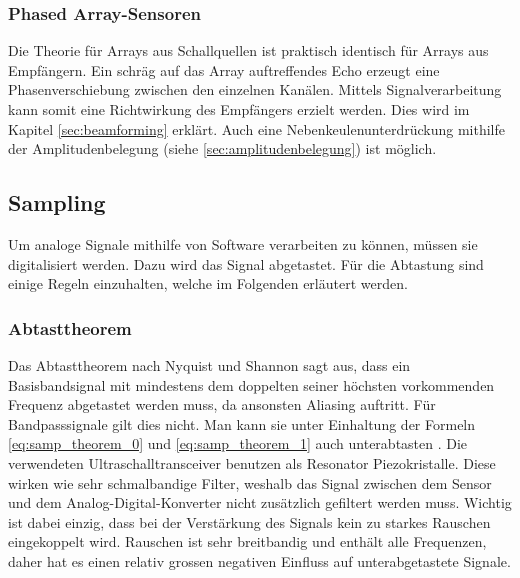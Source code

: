 \subsubsection{Phased Array-Sensoren}\label{sec:phased_array_sensoren}
Die Theorie für Arrays aus Schallquellen ist praktisch identisch für Arrays aus Empfängern. Ein schräg auf das Array auftreffendes Echo erzeugt eine Phasenverschiebung zwischen den einzelnen Kanälen. Mittels Signalverarbeitung kann somit eine Richtwirkung des Empfängers erzielt werden. Dies wird im Kapitel \ref{sec:beamforming} erklärt. Auch eine Nebenkeulenunterdrückung mithilfe der Amplitudenbelegung (siehe \ref{sec:amplitudenbelegung}) ist möglich.



\clearpage
\subsection{Sampling}\label{sec:sampling}
Um analoge Signale mithilfe von Software verarbeiten zu können, müssen sie digitalisiert werden. Dazu wird das Signal abgetastet. Für die Abtastung sind einige Regeln einzuhalten, welche im Folgenden erläutert werden.

\subsubsection{Abtasttheorem}\label{sec:abtasttheorem}
Das Abtasttheorem nach Nyquist und Shannon sagt aus, dass ein Basisbandsignal mit mindestens dem doppelten seiner höchsten vorkommenden Frequenz abgetastet werden muss, da ansonsten Aliasing auftritt. Für Bandpasssignale gilt dies nicht. Man kann sie unter Einhaltung der Formeln \ref{eq:samp_theorem_0} und \ref{eq:samp_theorem_1} auch unterabtasten \cite{RENNERT}. Die verwendeten Ultraschalltransceiver benutzen als Resonator Piezokristalle. Diese wirken wie sehr schmalbandige Filter, weshalb das Signal zwischen dem Sensor und dem Analog-Digital-Konverter nicht zusätzlich gefiltert werden muss. Wichtig ist dabei einzig, dass bei der Verstärkung des Signals kein zu starkes Rauschen eingekoppelt wird. Rauschen ist sehr breitbandig und enthält alle Frequenzen, daher hat es einen relativ grossen negativen Einfluss auf unterabgetastete Signale.

